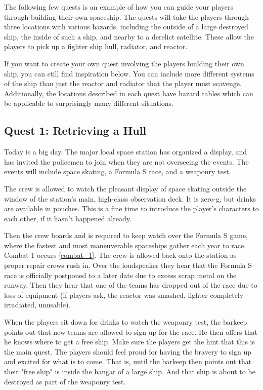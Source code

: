 \documentclass[a4paper]{article}
\begin{document}
The following few quests is an example of how you can guide your players through building their own spaceship. The quests will take the players through three locations with various hazards, including the outside of a large destroyed ship, the inside of such a ship, and nearby to a derelict satellite. These allow the players to pick up a fighter ship hull, radiator, and reactor. 

If you want to create your own quest involving the players building their own ship, you can still find inspiration below. You can include more different systems of the ship than just the reactor and radiator that the player must scavenge. Additionally, the locations described in each quest have hazard tables which can be applicable to surprisingly many different situations. 

\subsection{Quest 1: Retrieving a Hull} \label{quest_1}

Today is a big day. The major local space station has organized a display, and has invited the policemen to join when they are not overseeing the events. The events will include space skating, a Formula S race, and a weaponry test.

The crew is allowed to watch the pleasant display of space skating outside the window of the station's main, high-class observation deck. It is zero-g, but drinks are available in pouches. This is a fine time to introduce the player's characters to each other, if it hasn't happened already.

Then the crew boards and is required to keep watch over the Formula S game, where the fastest and most maneuverable spaceships gather each year to race. Combat 1 occurs \ref{combat_1}. The crew is allowed back onto the station as proper repair crews rush in. Over the loudspeaker they hear that the Formula S race is officially postponed to a later date due to excess scrap metal on the runway.  Then they hear that one of the teams has dropped out of the race due to loss of equipment (if players ask, the reactor was smashed, fighter completely irradiated, unusable). 

When the players sit down for drinks to watch the weaponry test, the barkeep points out that new teams are allowed to sign up for the race. He then offers that he knows where to get a free ship. Make sure the players get the hint that this is the main quest. The players should feel proud for having the bravery to sign up and excited for what is to come. That is, until the barkeep then points out that their "free ship" is inside the hangar of a large ship. And that ship is about to be destroyed as part of the weaponry test.
\end{document}
